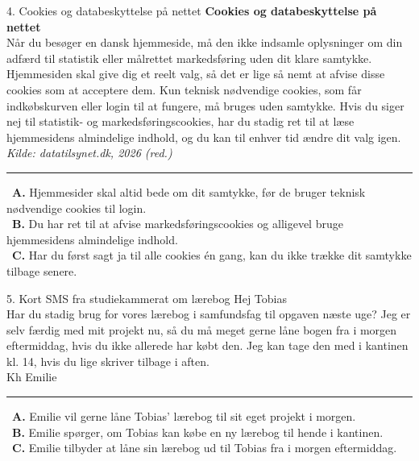 \begin{emailbox}{4. Cookies og databeskyttelse på nettet}
\textbf{Cookies og databeskyttelse på nettet}\\
Når du besøger en dansk hjemmeside, må den ikke indsamle oplysninger om din adfærd til statistik eller målrettet markedsføring uden dit klare samtykke. Hjemmesiden skal give dig et reelt valg, så det er lige så nemt at afvise disse cookies som at acceptere dem. Kun teknisk nødvendige cookies, som får indkøbskurven eller login til at fungere, må bruges uden samtykke. Hvis du siger nej til statistik- og markedsføringscookies, har du stadig ret til at læse hjemmesidens almindelige indhold, og du kan til enhver tid ændre dit valg igen.
\hfill {\small\textit{Kilde: datatilsynet.dk, 2026 (red.)}}

\vspace{0.3em}
\hrule
\vspace{0.3em}
\small
\fbox{\phantom{X}}\ \textbf{A.} Hjemmesider skal altid bede om dit samtykke, før de bruger teknisk nødvendige cookies til login.\\[0.25em]
\fbox{\phantom{X}}\ \textbf{B.} Du har ret til at afvise markedsføringscookies og alligevel bruge hjemmesidens almindelige indhold.\\[0.25em]
\fbox{\phantom{X}}\ \textbf{C.} Har du først sagt ja til alle cookies én gang, kan du ikke trække dit samtykke tilbage senere.
\end{emailbox}

\begin{emailbox}{5. Kort SMS fra studiekammerat om lærebog}
Hej Tobias\\
Har du stadig brug for vores lærebog i samfundsfag til opgaven næste uge? Jeg er selv færdig med mit projekt nu, så du må meget gerne låne bogen fra i morgen eftermiddag, hvis du ikke allerede har købt den. Jeg kan tage den med i kantinen kl. 14, hvis du lige skriver tilbage i aften.\\
Kh Emilie

\vspace{0.3em}
\hrule
\vspace{0.3em}
\small
\fbox{\phantom{X}}\ \textbf{A.} Emilie vil gerne låne Tobias' lærebog til sit eget projekt i morgen.\\[0.25em]
\fbox{\phantom{X}}\ \textbf{B.} Emilie spørger, om Tobias kan købe en ny lærebog til hende i kantinen.\\[0.25em]
\fbox{\phantom{X}}\ \textbf{C.} Emilie tilbyder at låne sin lærebog ud til Tobias fra i morgen eftermiddag.
\end{emailbox}

